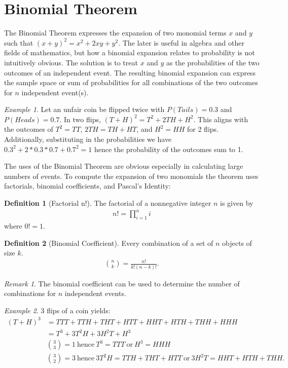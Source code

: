 \documentclass{article}
\theoremstyle{plain}
\theoremstyle{definition}
\newtheorem{definition}{Definition}
\theoremstyle{remark}
\newtheorem{remark}{Remark}
\newtheorem{example}{Example}
\begin{document}
\section{Binomial Theorem}
The Binomial Theorem expresses the expansion of two monomial terms $x$ and $y$ such that $(x + y)^2 = x^2 + 2xy + y^2$. The later is useful in algebra and other fields of mathematics, but how a binomial expansion relates to probability is not intuitively obvious. The solution is to treat $x$ and $y$ as the probabilities of the two outcomes of an independent event. The resulting binomial expansion can express the sample space or sum of probabilities for all combinations of the two outcomes for $n$ independent event(s).
\begin{example}
  Let an unfair coin be flipped twice with $P(Tails) = 0.3$ and $P(Heads) = 0.7$. In two flips, $(T + H)^2 = T^2 + 2TH + H^2$. This aligns with the outcomes of $T^2 = TT$, $2TH = TH + HT$, and $H^2 = HH$ for 2 flips. Additionally, substituting in the probabilities we have $0.3^2 + 2*0.3*0.7 + 0.7^2 = 1$ hence the probability of the outcomes sum to 1.
\end{example}
The uses of the Binomial Theorem are obvious especially in calculating large numbers of events. To compute the expansion of two monomials the theorem uses factorials, binomial coefficients, and Pascal's Identity:
\begin{definition}[Factorial n!]
  The factorial of a nonnegative integer $n$ is given by
  \begin{align*}
    n! = {\displaystyle\prod_{i=1}^{n}i}
  \end{align*}
  where $0! = 1$.
\end{definition}
\begin{definition}[Binomial Coefficient]
  Every combination of a set of $n$ objects of size $k$.
  \begin{align*}
    \binom{n}{k} = \frac{n!}{k!(n-k)!}.
  \end{align*}
\end{definition}
\begin{remark}
  The binomial coefficient can be used to determine the number of combinations for $n$ independent events.
 \end{remark}
\begin{example}
  3 flips of a coin yields:
  \begin{align*}
  (T + H)^3 &= TTT + TTH + THT + HTT + HHT+ HTH + THH + HHH \\
  &= T^3 + 3T^2H + 3H^2T + H^3 \\
  &\binom{3}{3} = 1\ \text{hence}\ T^3 = TTT\ \text{or}\ H^3 = HHH \\
  &\binom{3}{2} = 3\ \text{hence}\ 3T^2H = TTH + THT + HTT\ \text{or}\ 3H^2T = HHT+HTH+THH. \\
  \end{align*}
\end{example}
\end{document}
